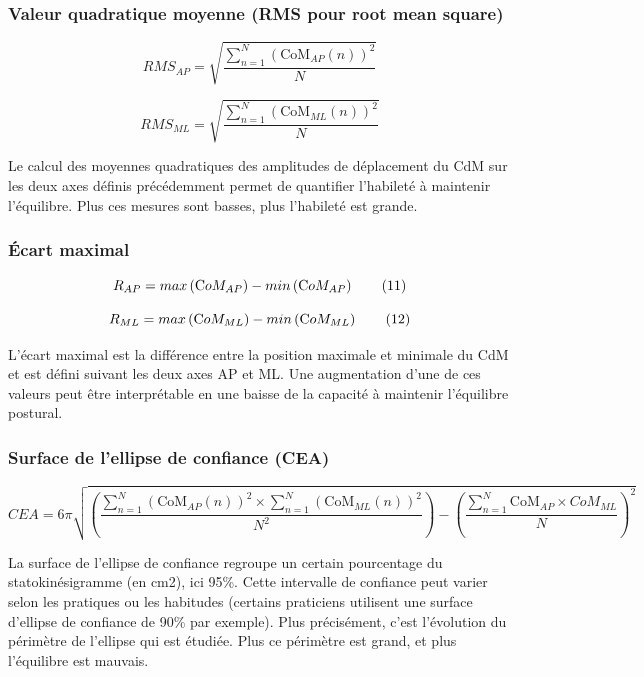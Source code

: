 \subsubsection{Valeur quadratique moyenne (RMS pour root mean square)}

\[
RMS_{AP} =\sqrt{  \frac{\sum_{n=1}^{N} \left (\text{CoM}_{AP}(n) \right)^2 }{N}}  \tag{9}
\]

\[
RMS_{ML} =\sqrt{  \frac{\sum_{n=1}^{N} \left (\text{CoM}_{ML}(n) \right)^2 }{N}}  \tag{10}
\]

Le calcul des moyennes quadratiques des amplitudes de déplacement du CdM sur les deux axes définis précédemment permet de quantifier l'habileté à maintenir l'équilibre. 
Plus ces mesures sont basses, plus l'habileté est grande.

\subsubsection{Écart maximal}

\[
R_{AP}= max \left ( \text CoM_{AP} \right ) - min\left ( \text CoM_{AP} \right ) \tag{11}
\]


\[R_{ML}= max \left ( \text CoM_{ML} \right ) - min\left ( \text CoM_{ML} \right ) \tag{12}
\]

L'écart maximal est la différence entre la position maximale et minimale du CdM et est défini suivant les deux axes AP et ML. 
Une augmentation d'une de ces valeurs peut être interprétable en une baisse de la capacité à maintenir l'équilibre postural.

\subsubsection{Surface de l'ellipse de confiance (CEA)}

\[
CEA= 6\pi \sqrt{ \left ( \frac{\sum_{n=1}^{N} \left (\text{CoM}_{AP}(n) \right)^2 \times \sum_{n=1}^{N} \left ( \text{CoM}_{ML}(n) \right)^2}{N^2} \right ) - \left (\frac{\sum_{n=1}^N \text{CoM}_{AP} \times CoM_{ML}}{N} \right)^2} \tag{13}
\]

La surface de l'ellipse de confiance regroupe un certain pourcentage du statokinésigramme (en cm2), ici 95\%. 
Cette intervalle de confiance peut varier selon les pratiques ou les habitudes (certains praticiens utilisent une surface d'ellipse de confiance de 90\% par exemple). 
Plus précisément, c'est l'évolution du périmètre de l'ellipse qui est étudiée. 
Plus ce périmètre est grand, et plus l'équilibre est mauvais.

